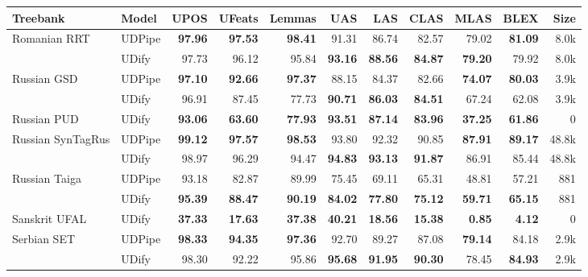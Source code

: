 \documentclass[11pt,a4paper]{article}
\begin{document}
\begin{table*}
    \fontsize{8}{10}\selectfont
    \begin{center}
    \begin{tabular}{@{}llrrrrrrrrr@{}}
    \toprule
    \sc Treebank & \sc Model & \sc UPOS & \sc UFeats & \sc Lemmas & \sc UAS & \sc LAS & \sc CLAS & \sc  MLAS & \sc BLEX & \sc Size \\
    \midrule
    Romanian RRT & UDPipe &  \bf 97.96 &  \bf 97.53 &   \bf 98.41 &      91.31 &      86.74 &      82.57 &      79.02 &  \bf 81.09 &   8.0k \\
               & UDify &      97.73 &      96.12 &       95.84 &  \bf 93.16 &  \bf 88.56 &  \bf 84.87 &  \bf 79.20 &      79.92 &   8.0k \\
    \addlinespace
    Russian GSD & UDPipe &  \bf 97.10 &  \bf 92.66 &   \bf 97.37 &      88.15 &      84.37 &      82.66 &  \bf 74.07 &  \bf 80.03 &   3.9k \\
               & UDify &      96.91 &      87.45 &       77.73 &  \bf 90.71 &  \bf 86.03 &  \bf 84.51 &      67.24 &      62.08 &   3.9k \\
    \addlinespace
    Russian PUD & UDify &  \bf 93.06 &  \bf 63.60 &   \bf 77.93 &  \bf 93.51 &  \bf 87.14 &  \bf 83.96 &  \bf 37.25 &  \bf 61.86 &      0 \\
    \addlinespace
    Russian SynTagRus & UDPipe &  \bf 99.12 &  \bf 97.57 &   \bf 98.53 &      93.80 &      92.32 &      90.85 &  \bf 87.91 &  \bf 89.17 &  48.8k \\
               & UDify &      98.97 &      96.29 &       94.47 &  \bf 94.83 &  \bf 93.13 &  \bf 91.87 &      86.91 &      85.44 &  48.8k \\
    \addlinespace
    Russian Taiga & UDPipe &      93.18 &      82.87 &       89.99 &      75.45 &      69.11 &      65.31 &      48.81 &      57.21 &    881 \\
               & UDify &  \bf 95.39 &  \bf 88.47 &   \bf 90.19 &  \bf 84.02 &  \bf 77.80 &  \bf 75.12 &  \bf 59.71 &  \bf 65.15 &    881 \\
    \addlinespace
    Sanskrit UFAL & UDify &  \bf 37.33 &  \bf 17.63 &   \bf 37.38 &  \bf 40.21 &  \bf 18.56 &  \bf 15.38 &   \bf 0.85 &   \bf 4.12 &      0 \\
    \addlinespace
    Serbian SET & UDPipe &  \bf 98.33 &  \bf 94.35 &   \bf 97.36 &      92.70 &      89.27 &      87.08 &  \bf 79.14 &      84.18 &   2.9k \\
               & UDify &      98.30 &      92.22 &       95.86 &  \bf 95.68 &  \bf 91.95 &  \bf 90.30 &      78.45 &  \bf 84.93 &   2.9k \\

\end{tabular}
\end{center}
\end{table*}
\end{document}

